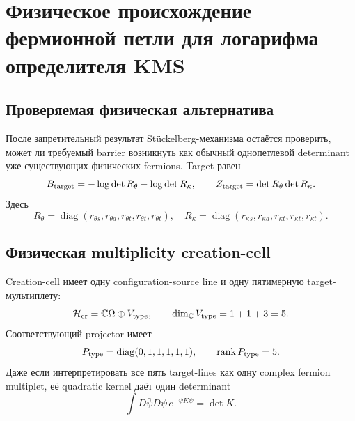 \chapter{Физическое происхождение фермионной петли для логарифма определителя KMS}
\label{ch:v9-kms-physical-fermion-loop-origin}

\section{Проверяемая физическая альтернатива}

После запретительный результат Stückelberg-механизма остаётся проверить, может ли требуемый
barrier возникнуть как обычный однопетлевой determinant уже существующих
физических fermions. Target равен
\begin{equation}
 B_{\rm target}=-\log\det R_\theta-\log\det R_\kappa,
 \qquad
 Z_{\rm target}=\det R_\theta\det R_\kappa.
 \label{eq:v9-kms-physical-loop-target}
\end{equation}
Здесь
\begin{equation}
 R_\theta=\operatorname{diag}(r_{\theta s},r_{\theta a},
 r_{\theta t},r_{\theta t},r_{\theta t}),
 \quad
 R_\kappa=\operatorname{diag}(r_{\kappa s},r_{\kappa a},
 r_{\kappa t},r_{\kappa t},r_{\kappa t}).
 \label{eq:v9-kms-physical-loop-type-operators}
\end{equation}

\section{Физическая multiplicity creation-cell}

Creation-cell имеет одну configuration-source line и одну пятимерную
target-мультиплету:
\begin{equation}
 \mathcal H_{\rm cr}=\mathbb C\Omega\oplus V_{\rm type},
 \qquad \dim_{\mathbb C}V_{\rm type}=1+1+3=5.
 \label{eq:v9-kms-physical-loop-carrier}
\end{equation}
Соответствующий projector имеет
\begin{equation}
 P_{\rm type}=\operatorname{diag}(0,1,1,1,1,1),
 \qquad \operatorname{rank} P_{\rm type}=5.
 \label{eq:v9-kms-physical-loop-projector}
\end{equation}
Даже если интерпретировать все пять target-lines как одну complex fermion
multiplet, её quadratic kernel даёт один determinant
\begin{equation}
 \int D\bar\psi D\psi\,
 e^{-\bar\psi K\psi}=\det K.
 \label{eq:v9-kms-physical-loop-gaussian}
\end{equation}


